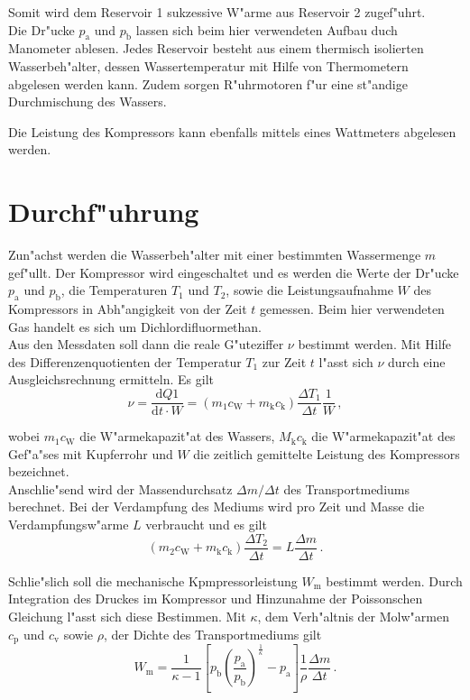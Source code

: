 	Somit wird dem Reservoir 1 sukzessive W"arme aus Reservoir 2 zugef"uhrt. \\


	Die Dr"ucke $p_\mathrm{a}$ und $p_\mathrm{b}$ lassen sich beim hier verwendeten Aufbau duch Manometer ablesen.
	Jedes Reservoir besteht aus einem thermisch isolierten Wasserbeh"alter, dessen Wassertemperatur mit Hilfe von Thermometern abgelesen werden kann.
	Zudem sorgen R"uhrmotoren f"ur eine st"andige Durchmischung des Wassers.

	Die Leistung des Kompressors kann ebenfalls mittels eines Wattmeters abgelesen werden.
	
\clearpage
\section{Durchf"uhrung}
\label{sec:durchfuehrung}
	Zun"achst werden die Wasserbeh"alter mit einer bestimmten Wassermenge $m$ gef"ullt.
	Der Kompressor wird eingeschaltet und es werden die Werte der Dr"ucke $p_\mathrm{a}$ und $p_\mathrm{b}$, die Temperaturen $T_1$ und $T_2$, sowie die Leistungsaufnahme $W$ des Kompressors in Abh"angigkeit von der Zeit $t$ gemessen.
	Beim hier verwendeten Gas handelt es sich um Dichlordifluormethan. \\

	Aus den Messdaten soll dann die reale G"uteziffer $\nu$ bestimmt werden.
	Mit Hilfe des Differenzenquotienten der Temperatur $T_1$ zur Zeit $t$ l"asst sich $\nu$ durch eine Ausgleichsrechnung ermitteln. Es gilt
	\begin{equation}
		\nu = \frac{\mathrm{d}Q1}{\mathrm{d}t \cdot W} = (m_1 c_\mathrm{W} + m_\mathrm{k} c_\mathrm{k}) \frac{\Delta T_1}{\Delta t} \frac{1}{W} \,, \label{nu_real}
	\end{equation}

	wobei $m_1 c_\mathrm{W}$ die W"armekapazit"at des Wassers, $M_\mathrm{k} c_\mathrm{k}$ die W"armekapazit"at des Gef"a"ses mit Kupferrohr und $W$ die zeitlich gemittelte Leistung des Kompressors bezeichnet. \\

	Anschlie"send wird der Massendurchsatz $\Delta m / \Delta t$ des Transportmediums berechnet.
	Bei der Verdampfung des Mediums wird pro Zeit und Masse die Verdampfungsw"arme $L$ verbraucht und es gilt
	\begin{equation}
		(m_2 c_\mathrm{W} + m_\mathrm{k} c_\mathrm{k}) \frac{\Delta T_2}{\Delta t} = L \frac{\Delta m}{\Delta t} \,. \label{masse_theo}
	\end{equation}

	Schlie"slich soll die mechanische Kpmpressorleistung $W_\mathrm{m}$ bestimmt werden.
	Durch Integration des Druckes im Kompressor und Hinzunahme der Poissonschen Gleichung l"asst sich diese Bestimmen.
	Mit $\kappa$, dem Verh"altnis der Molw"armen $c_\mathrm{p}$ und $c_\mathrm{v}$ sowie $\rho$, der Dichte des Transportmediums gilt
	\begin{equation}
		W_\mathrm{m} = \frac{1}{\kappa -1} \left[p_\mathrm{b} \left(\frac{p_\mathrm{a}}{p_\mathrm{b}}\right)^\frac{1}{\kappa} - p_\mathrm{a}\right] \frac{1}{\rho}\frac{\Delta m}{\Delta t} \,. \label{arbeitarbeit}
	\end{equation}